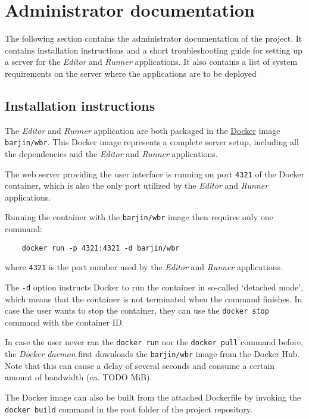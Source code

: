 
\section{Administrator documentation}

The following section contains the administrator documentation of the project.
It contains installation instructions and a short troubleshooting guide for setting up a server for the \textit{Editor} and \textit{Runner} applications. 
It also contains a list of system requirements on the server where the applications are to be deployed

\subsection{Installation instructions}

The \textit{Editor} and \textit{Runner} application are both packaged in the \href{https://www.docker.com/}{Docker} image \texttt{barjin/wbr}.
This Docker image represents a complete server setup, including all the dependencies and the \textit{Editor} and \textit{Runner} applications.

The web server providing the user interface is running on port \texttt{4321} of the Docker container, which is also the only port utilized by the \textit{Editor} and \textit{Runner} applications.

Running the container with the \texttt{barjin/wbr} image then requires only one command:
\begin{verbatim}
    docker run -p 4321:4321 -d barjin/wbr
\end{verbatim}
where \texttt{4321} is the port number used by the \textit{Editor} and \textit{Runner} applications.

The \texttt{-d} option instructs Docker to run the container in so-called `detached mode', which means that the container is not terminated when the command finishes. 
In case the user wants to stop the container, they can use the \texttt{docker stop} command with the container ID.

In case the user never ran the \texttt{docker run} nor the \texttt{docker pull} command before, the \textit{Docker daemon} first downloads the \texttt{barjin/wbr} image from the Docker Hub.
Note that this can cause a delay of several seconds and consume a certain amount of bandwidth (ca. TODO MiB).

The Docker image can also be built from the attached Dockerfile by invoking the \texttt{docker build} command in the root folder of the project repository.

